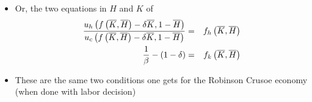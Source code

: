 \documentclass[notes=show]{beamer}
\begin{document}
\begin{frame}%


\begin{itemize}
\item Or, the two equations in $H$ and $K$ of%
\begin{eqnarray*}
\frac{u_{h}\left( f\left( \overline{K},\overline{H}\right) -\delta \overline{%
K},1-\overline{H}\right) }{u_{c}\left( f\left( \overline{K},\overline{H}%
\right) -\delta \overline{K},1-\overline{H}\right) } &=&f_{h}\left( 
\overline{K},\overline{H}\right) \\
\frac{1}{\beta }-\left( 1-\delta \right) &=&f_{k}\left( \overline{K},%
\overline{H}\right)
\end{eqnarray*}

\item These are the same two conditions one gets for the Robinson Crusoe
economy (when done with labor decision)
\end{itemize}

\end{frame}%
\end{document}

